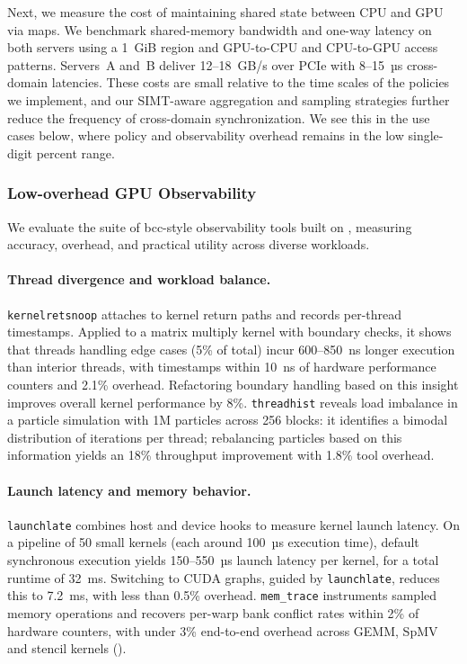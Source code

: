 Next, we measure the cost of maintaining shared state between CPU and GPU via
\sys maps. We benchmark shared-memory bandwidth and one-way latency on both
servers using a 1~GiB region and GPU-to-CPU and CPU-to-GPU access patterns.
Servers~A and~B deliver 12--18~GB/s over PCIe with 8--15~µs cross-domain
latencies. These costs are small relative to the time scales of the policies we
implement, and our SIMT-aware aggregation and sampling strategies further reduce
the frequency of cross-domain synchronization. We see this in the use cases
below, where policy and observability overhead remains in the low single-digit
percent range.

\subsubsection{Low-overhead GPU Observability}

We evaluate the suite of bcc-style observability tools built on \sys, measuring
accuracy, overhead, and practical utility across diverse workloads.

\paragraph{Thread divergence and workload balance.}
\texttt{kernelretsnoop} attaches to kernel return paths and records per-thread
timestamps. Applied to a matrix multiply kernel with boundary checks, it shows
that threads handling edge cases (5\% of total) incur 600--850~ns longer
execution than interior threads, with timestamps within 10~ns of hardware
performance counters and 2.1\% overhead. Refactoring boundary handling based on
this insight improves overall kernel performance by 8\%. \texttt{threadhist}
reveals load imbalance in a particle simulation with 1M particles across 256
blocks: it identifies a bimodal distribution of iterations per thread;
rebalancing particles based on this information yields an 18\% throughput
improvement with 1.8\% tool overhead.

\paragraph{Launch latency and memory behavior.}
\texttt{launchlate} combines host and device hooks to measure kernel launch
latency. On a pipeline of 50 small kernels (each around 100~µs execution time),
default synchronous execution yields 150--550~µs launch latency per kernel, for
a total runtime of 32~ms. Switching to CUDA graphs, guided by
\texttt{launchlate}, reduces this to 7.2~ms, with less than 0.5\% overhead.
\texttt{mem\_trace} instruments sampled memory operations and recovers per-warp
bank conflict rates within 2\% of hardware counters, with under 3\% end-to-end
overhead across GEMM, SpMV and stencil kernels ().

